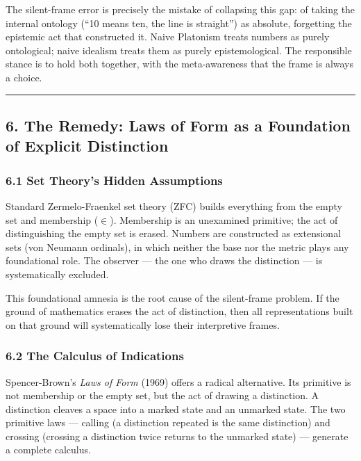 \documentclass[
]{article}
\begin{document}
The silent-frame error is precisely the mistake of collapsing this gap:
of taking the internal ontology (``10 means ten, the line is straight'')
as absolute, forgetting the epistemic act that constructed it. Naive
Platonism treats numbers as purely ontological; naive idealism treats
them as purely epistemological. The responsible stance is to hold both
together, with the meta-awareness that the frame is always a choice.

\begin{center}\rule{0.5\linewidth}{0.5pt}\end{center}

\subsection{6. The Remedy: Laws of Form as a Foundation of Explicit
Distinction}\label{the-remedy-laws-of-form-as-a-foundation-of-explicit-distinction}

\subsubsection{6.1 Set Theory's Hidden
Assumptions}\label{set-theorys-hidden-assumptions}

Standard Zermelo-Fraenkel set theory (ZFC) builds everything from the
empty set and membership (\(\in\)). Membership is an unexamined
primitive; the act of distinguishing the empty set is erased. Numbers
are constructed as extensional sets (von Neumann ordinals), in which
neither the base nor the metric plays any foundational role. The
observer --- the one who draws the distinction --- is systematically
excluded.

This foundational amnesia is the root cause of the silent-frame problem.
If the ground of mathematics erases the act of distinction, then all
representations built on that ground will systematically lose their
interpretive frames.

\subsubsection{6.2 The Calculus of
Indications}\label{the-calculus-of-indications}

Spencer-Brown's \emph{Laws of Form} (1969) offers a radical alternative.
Its primitive is not membership or the empty set, but the act of drawing
a distinction. A distinction cleaves a space into a marked state and an
unmarked state. The two primitive laws --- calling (a distinction
repeated is the same distinction) and crossing (crossing a distinction
twice returns to the unmarked state) --- generate a complete calculus.
\end{document}
